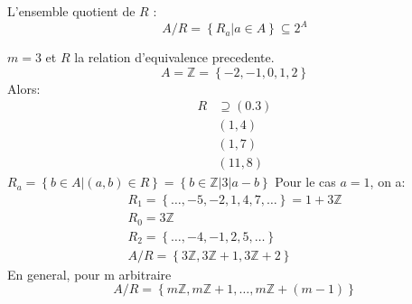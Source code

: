\documentclass[../main.tex]{subfiles}
\begin{document}
\begin{defn}\label{defn:l_ensemble_quotient}
	L'ensemble quotient de $R$ :
	\[ 
	A / R = \left\{ R_a \vert a \in A \right\} \subseteq 2^{A}
	\]
	
\end{defn}
\begin{exemple}\label{exemple:cas_de_relation_d_equivalence}
	$m=3$ et $R$ la relation d'equivalence precedente.
	\[ 
	A= \mathbb{Z} = \left\{ -2,-1,0,1,2 \right\} 
	\]
	Alors:
	\begin{align*}
		R &\supseteq (0.3)\\
		  & ( 1,4)\\
		  & ( 1,7)\\
		  & ( 11,8)
	\end{align*}
	$R_a= \left\{ b \in A \vert ( a,b) \in R \right\} = \left\{ b \in \mathbb{Z} \vert 3 \vert a-b \right\}$
	Pour le cas $a=1$, on a:
	\begin{align*}
	R_1= \left\{ \ldots, -5,-2,1,4,7,\ldots \right\} = 1 + 3 \mathbb{Z}\\
	R_0= 3 \mathbb{Z}\\
	R_2 = \left\{ \ldots,-4,-1,2,5,\ldots \right\} \\
	A / R = \left\{ 3\mathbb{Z}, 3\mathbb{Z}+1, 3\mathbb{Z}+2 \right\} 
	\end{align*}
	En general, pour m arbitraire
	\[ 
		A / R = \left\{ m \mathbb{Z}, m \mathbb{Z} +1, \ldots, m\mathbb{Z} + (m-1) \right\} 
	\]
\end{exemple}
\end{document}
